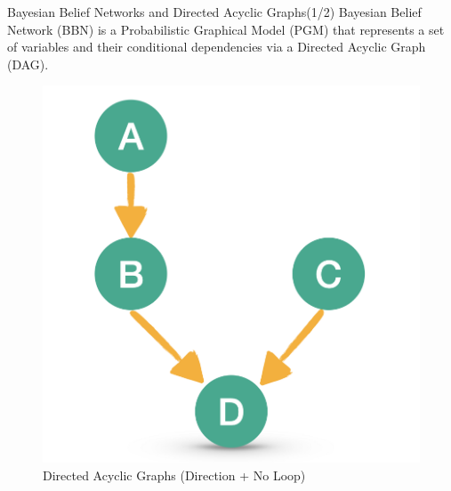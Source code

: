 \documentclass{beamer}
\begin{document}
	\begin{frame}[t]{Bayesian Belief Networks and Directed Acyclic Graphs(1/2)}
		Bayesian Belief Network (BBN) is a Probabilistic Graphical Model (PGM) that represents a set of variables and their conditional dependencies via a Directed Acyclic Graph (DAG).
		\begin{figure}
			\centering
			\includegraphics[scale=0.1]{dag.png}
			\caption{Directed Acyclic Graphs (Direction + No Loop)}
		\end{figure}
	\end{frame}
\end{document}
